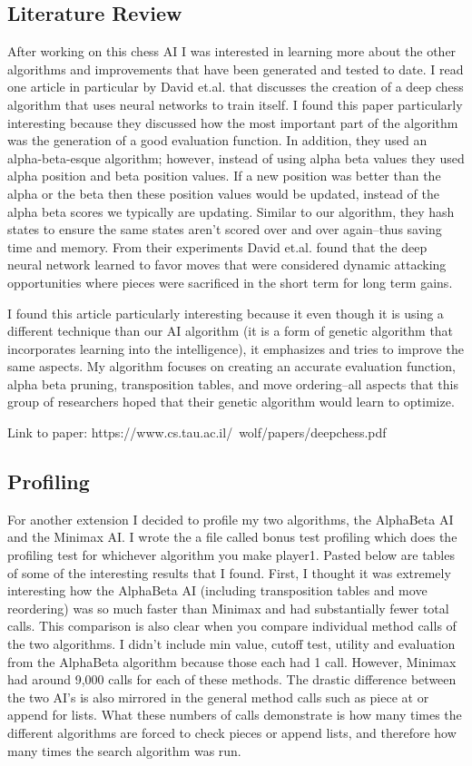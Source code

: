 \documentclass{article}
\begin{document}
\subsection{Literature Review}
After working on this chess AI I was interested in learning more about the other algorithms and improvements that have been generated and tested to date. I read one article in particular by David et.al. that discusses the creation of a deep chess algorithm that uses neural networks to train itself. I found this paper particularly interesting because they discussed how the most important part of the algorithm was the generation of a good evaluation function. In addition, they used an alpha-beta-esque algorithm; however, instead of using alpha beta values they used alpha position and beta position values. If a new position was better than the alpha or the beta then these position values would be updated, instead of the alpha beta scores we typically are updating. Similar to our algorithm, they hash states to ensure the same states aren't scored over and over again--thus saving time and memory. From their experiments David et.al. found that the deep neural network learned to favor moves that were considered dynamic attacking opportunities where pieces were sacrificed in the short term for long term gains. 

I found this article particularly interesting because it even though it is using a different technique than our AI algorithm (it is a form of genetic algorithm that incorporates learning into the intelligence), it emphasizes and tries to improve the same aspects. My algorithm focuses on creating an accurate evaluation function, alpha beta pruning, transposition tables, and move ordering--all aspects that this group of researchers hoped that their genetic algorithm would learn to optimize. 

Link to paper: https://www.cs.tau.ac.il/~wolf/papers/deepchess.pdf 

\subsection{Profiling}
For another extension I decided to profile my two algorithms, the AlphaBeta AI and the Minimax AI. I wrote the a file called bonus test profiling which does the profiling test for whichever algorithm you make player1. Pasted below are tables of some of the interesting results that I found. First, I thought it was extremely interesting how the AlphaBeta AI (including transposition tables and move reordering) was so much faster than Minimax and had substantially fewer total calls. This comparison is also clear when you compare individual method calls of the two algorithms. I didn't include min value, cutoff test, utility and evaluation from the AlphaBeta algorithm because those each had 1 call. However, Minimax had around 9,000 calls for each of these methods. The drastic difference between the two AI's is also mirrored in the general method calls such as piece at or append for lists. What these numbers of calls demonstrate is how many times the different algorithms are forced to check pieces or append lists, and therefore how many times the search algorithm was run. 
\end{document}

